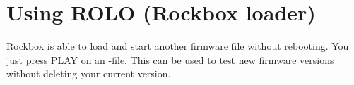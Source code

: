 \section{\label{ref:using_rolo}Using ROLO (Rockbox loader)}
Rockbox is able to load and start another firmware file without rebooting. 
You just press PLAY on an%
%
-file. This can be used to test new firmware versions without deleting your
current version.

